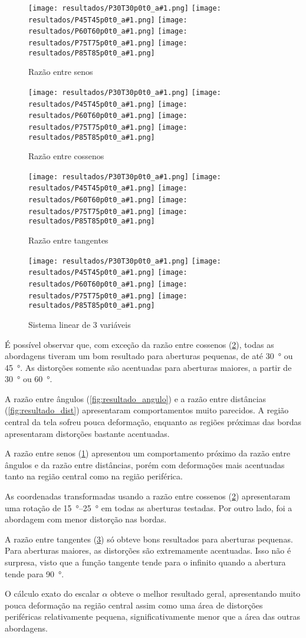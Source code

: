 \documentclass[brazil,pagestart=firstchapter]{abnt}
\newcommand*{\resultadoimagens}[1]{
	\texttt{[image: resultados/P30T30p0t0\_a\#1.png]}
	\texttt{[image: resultados/P45T45p0t0\_a\#1.png]}
	\texttt{[image: resultados/P60T60p0t0\_a\#1.png]}
	\texttt{[image: resultados/P75T75p0t0\_a\#1.png]}
	\texttt{[image: resultados/P85T85p0t0\_a\#1.png]}
}
\begin{document}
\begin{figure}
\centering
\resultadoimagens{9}
\caption{Razão entre senos}
\label{fig:resultado_sin}
\end{figure}


\begin{figure}
\centering
\resultadoimagens{8}
\caption{Razão entre cossenos}
\label{fig:resultado_cos}
\end{figure}

\begin{figure}
\centering
\resultadoimagens{10}
\caption{Razão entre tangentes}
\label{fig:resultado_tan}
\end{figure}

\begin{figure}
\centering
\resultadoimagens{13}
\caption{Sistema linear de 3 variáveis}
\label{fig:resultado_lineq}
\end{figure}

É possível observar que, com exceção da razão entre cossenos
(\ref{fig:resultado_cos}), todas as abordagens tiveram um bom resultado para
aberturas pequenas, de até \SI{30}{\degree} ou \SI{45}{\degree}. As
distorções somente são acentuadas para aberturas maiores, a partir de
\SI{30}{\degree} ou \SI{60}{\degree}.

A razão entre ângulos (\ref{fig:resultado_angulo}) e a razão entre
distâncias (\ref{fig:resultado_dist}) apresentaram comportamentos muito
parecidos. A região central da tela sofreu pouca deformação, enquanto as
regiões próximas das bordas apresentaram distorções bastante acentuadas.

A razão entre senos (\ref{fig:resultado_sin}) apresentou um comportamento
próximo da razão entre ângulos e da razão entre distâncias, porém com
deformações mais acentuadas tanto na região central como na região
periférica.

As coordenadas transformadas usando a razão entre cossenos
(\ref{fig:resultado_cos}) apresentaram uma rotação de
\SIrange{15}{25}{\degree} em todas as aberturas testadas. Por outro lado,
foi a abordagem com menor distorção nas bordas.

A razão entre tangentes (\ref{fig:resultado_tan}) só obteve bons resultados
para aberturas pequenas. Para aberturas maiores, as distorções são
extremamente acentuadas. Isso não é surpresa, visto que a função tangente
tende para o infinito quando a abertura tende para \SI{90}{\degree}.

O cálculo exato do escalar $\alpha$ obteve o melhor resultado geral,
apresentando muito pouca deformação na região central assim como uma área de
distorções periféricas relativamente pequena, significativamente menor que a
área das outras abordagens.
\end{document}
